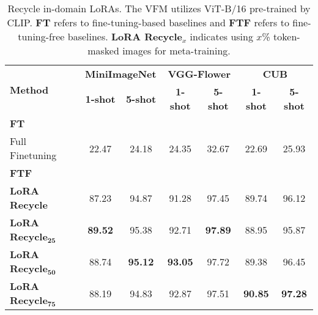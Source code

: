 \documentclass{article}
\begin{document}
\begin{table}[ht]
\centering
\caption{Recycle in-domain LoRAs. The VFM utilizes ViT-B/16 pre-trained by CLIP. \textbf{FT} refers to fine-tuning-based baselines and \textbf{FTF} refers to fine-tuning-free baselines. \textbf{LoRA Recycle}$_x$ indicates using $x$\% token-masked images for meta-training.}
\label{tab:in_domain_loras}
\begin{tabular}{lcccccc}
\toprule
\multirow{2}{*}{\textbf{Method}} & \multicolumn{2}{c}{\textbf{MiniImageNet}} & \multicolumn{2}{c}{\textbf{VGG-Flower}} & \multicolumn{2}{c}{\textbf{CUB}} \\
\cmidrule(lr){2-3} \cmidrule(lr){4-5} \cmidrule(lr){6-7}
& \textbf{1-shot} & \textbf{5-shot} & \textbf{1-shot} & \textbf{5-shot} & \textbf{1-shot} & \textbf{5-shot} \\
\midrule
\multicolumn{7}{l}{\textbf{FT}} \\
\quad Full Finetuning & 22.47 & 24.18 & 24.35 & 32.67 & 22.69 & 25.93 \\
\midrule
\multicolumn{7}{l}{\textbf{FTF}} \\
\quad \textbf{LoRA Recycle} & 87.23 & 94.87 & 91.28 & 97.45 & 89.74 & 96.12 \\
\quad \textbf{LoRA Recycle}$_{\mathbf{25}}$ & \textbf{89.52} & 95.38 & 92.71 & \textbf{97.89} & 88.95 & 95.87 \\
\quad \textbf{LoRA Recycle}$_{\mathbf{50}}$ & 88.74 & \textbf{95.12} & \textbf{93.05} & 97.72 & 89.38 & 96.45 \\
\quad \textbf{LoRA Recycle}$_{\mathbf{75}}$ & 88.19 & 94.83 & 92.87 & 97.51 & \textbf{90.85} & \textbf{97.28} \\
\bottomrule
\end{tabular}
\end{table}
\end{document}
